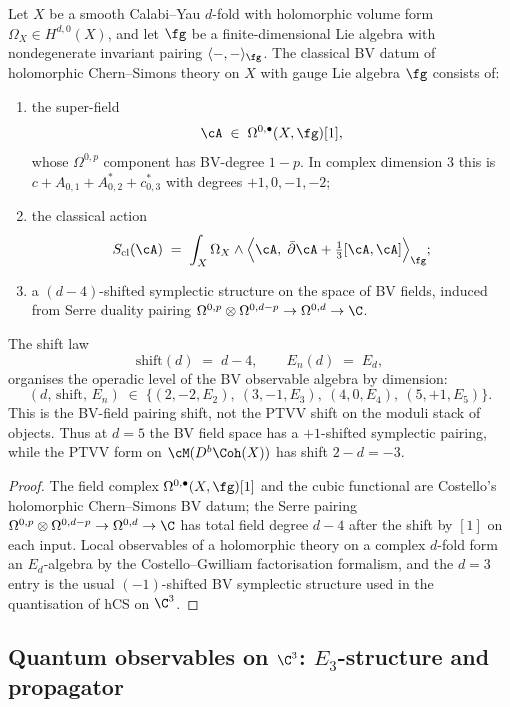 \begin{theorem}
\label{thm:plat-hCS-classical}
Let $X$ be a smooth Calabi--Yau $d$-fold with holomorphic volume form
$\Omega_X \in H^{d,0}(X)$, and let $\fg$ be a finite-dimensional Lie
algebra with nondegenerate invariant pairing
$\langle-,-\rangle_\fg$. The classical BV datum of holomorphic
Chern--Simons theory on $X$ with gauge Lie algebra $\fg$ consists of:
\begin{enumerate}[label=\textup{(\alph*)}]
\item the super-field
\[
 \cA \;\in\; \Omega^{0,\bullet}(X,\fg)[1],
\]
whose $\Omega^{0,p}$ component has BV-degree $1-p$. In complex
dimension $3$ this is
$c + A_{0,1} + A^*_{0,2} + c^*_{0,3}$ with degrees
$+1,0,-1,-2$;
\item the classical action
\[
 S_{\mathrm{cl}}(\cA)
 \;=\; \int_X \Omega_X \wedge
 \Big\langle \cA,\; \bar\partial \cA + \tfrac{1}{3}[\cA,\cA]\Big\rangle_\fg;
\]
\item a $(d{-}4)$-shifted symplectic structure on the space of BV
fields, induced from Serre duality pairing
$\Omega^{0,p} \otimes \Omega^{0, d-p} \to \Omega^{0,d} \to \C$.
\end{enumerate}
The shift law
\[
 \mathrm{shift}(d) \;=\; d - 4,
 \qquad
 E_n(d) \;=\; E_{d},
\]
organises the operadic level of the BV observable algebra by dimension:
\[
 (d,\,\mathrm{shift},\,E_n)
 \;\in\;
 \bigl\{(2,-2,E_2),\ (3,-1,E_3),\ (4,0,E_4),\ (5,+1,E_5)\bigr\}.
\]
This is the BV-field pairing shift, not the PTVV shift on the moduli
stack of objects. Thus at $d=5$ the BV field space has a
$+1$-shifted symplectic pairing, while the PTVV form on
$\cM(D^b\Coh(X))$ has shift $2-d=-3$.
\end{theorem}

\begin{proof}
The field complex $\Omega^{0,\bullet}(X,\fg)[1]$ and the cubic
functional are Costello's holomorphic Chern--Simons BV datum; the
Serre pairing
$\Omega^{0,p}\otimes\Omega^{0,d-p}\to\Omega^{0,d}\to\C$ has total
field degree $d-4$ after the shift by $[1]$ on each input. Local
observables of a holomorphic theory on a complex $d$-fold form an
$E_d$-algebra by the Costello--Gwilliam factorisation formalism, and
the $d=3$ entry is the usual $(-1)$-shifted BV symplectic structure
used in the quantisation of hCS on $\C^3$.
\end{proof}

\subsection{Quantum observables on \texorpdfstring{$\C^3$}{C-3}: \texorpdfstring{$E_3$}{E-3}-structure and propagator}
\label{subsec:hcs-quantum-observables}

